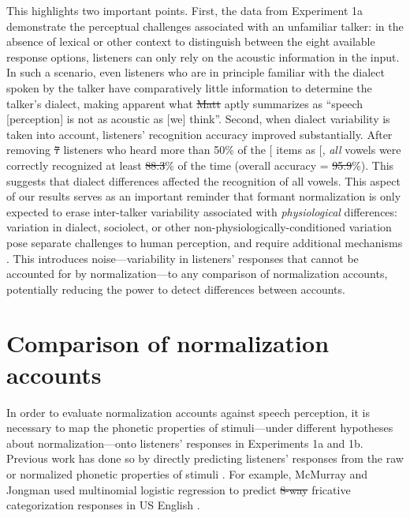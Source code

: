 \documentclass[preprint]{JASA}
\providecommand{\DIFadd}[1]{{\protect\color{blue}\uwave{#1}}} %
\providecommand{\DIFdel}[1]{{\protect\color{red}\sout{#1}}}                      %
\providecommand{\DIFaddbegin}{} %
\providecommand{\DIFaddend}{} %
\providecommand{\DIFdelbegin}{} %
\providecommand{\DIFdelend}{} %
\begin{document}
This highlights two important points. First, the data from Experiment 1a demonstrate the perceptual challenges associated with an unfamiliar talker: in the absence of lexical or other context to distinguish between the eight available response options, listeners can only rely on the acoustic information in the input. In such a scenario, even listeners who are in principle familiar with the dialect spoken by the talker have comparatively little information to determine the talker's dialect, making apparent what \DIFdelbegin \DIFdel{Matt }\DIFdelend \citet{winn2018} aptly summarizes as ``speech {[}perception{]} is not as acoustic as {[}we{]} think''. Second, when dialect variability is taken into account, listeners' recognition accuracy improved substantially. After removing \DIFdelbegin \DIFdel{7 }\DIFdelend \DIFaddbegin \DIFadd{8 }\DIFaddend listeners who heard more than 50\% of the {[}\ipatext{ɪ}{]} items as {[}\ipatext{ɛ}{]}, \emph{all} vowels were correctly recognized at least \DIFdelbegin \DIFdel{88.3}\DIFdelend \DIFaddbegin \DIFadd{87.1}\DIFaddend \% of the time (overall accuracy = \DIFdelbegin \DIFdel{95.9}\DIFdelend \DIFaddbegin \DIFadd{94.8}\DIFaddend \%). This suggests that dialect differences affected the recognition of all vowels. This aspect of our results serves as an important reminder that formant normalization is only expected to erase inter-talker variability associated with \emph{physiological} differences: variation in dialect, sociolect, or other non-physiologically-conditioned variation pose separate challenges to human perception, and require additional mechanisms \citep[see discussion in][]{barreda2021, weatherholtz-jaeger2016}. This introduces noise---variability in listeners' responses that cannot be accounted for by normalization---to any comparison of normalization accounts, potentially reducing the power to detect differences between accounts.

\section{Comparison of normalization accounts}\label{comparison-of-normalization-accounts}

In order to evaluate normalization accounts against speech perception, it is necessary to map the phonetic properties of stimuli---under different hypotheses about normalization---onto listeners' responses in Experiments 1a and 1b. Previous work has done so by directly predicting listeners' responses from the raw or normalized phonetic properties of stimuli \citep{apfelbaum-mcmurray2015, barreda2021, crinnion2020, mcmurray-jongman2011, nearey1989}. For example, McMurray and Jongman used multinomial logistic regression to predict \DIFdelbegin \DIFdel{8-way }\DIFdelend \DIFaddbegin \DIFadd{eight-way }\DIFaddend fricative categorization responses in US English \citep[see also][]{barreda2021}.
\end{document}
